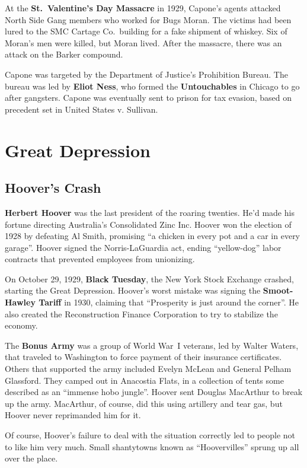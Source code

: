 At the \textbf{St.\ Valentine's Day Massacre} in 1929,
Capone's agents attacked North Side Gang members who worked for Bugs Moran.
The victims had been lured to the SMC Cartage Co.\ building for a fake shipment of whiskey.
Six of Moran's men were killed, but Moran lived.
After the massacre, there was an attack on the Barker compound.

Capone was targeted by the Department of Justice's Prohibition Bureau.
The bureau was led by \textbf{Eliot Ness}, who formed the \textbf{Untouchables} in Chicago to go after gangsters.
Capone was eventually sent to prison for tax evasion,
based on precedent set in United States v. Sullivan.

\section{Great Depression}

\subsection*{Hoover's Crash}

\textbf{Herbert Hoover} was the last president of the roaring twenties.
He'd made his fortune directing Australia's Consolidated Zinc Inc.
Hoover won the election of 1928 by defeating Al Smith,
promising ``a chicken in every pot and a car in every garage''.
Hoover signed the Norris-LaGuardia act,
ending ``yellow-dog'' labor contracts that prevented employees from unionizing.

On October 29, 1929, \textbf{Black Tuesday}, the New York Stock Exchange crashed, starting the Great Depression.
Hoover's worst mistake was signing the \textbf{Smoot-Hawley Tariff} in 1930,
claiming that ``Prosperity is just around the corner''.
He also created the Reconstruction Finance Corporation to try to stabilize the economy.

The \textbf{Bonus Army} was a group of World War~I veterans, led by Walter Waters,
that traveled to Washington to force payment of their insurance certificates.
Others that supported the army included Evelyn McLean and General Pelham Glassford.
They camped out in Anacostia Flats, in a collection of tents some described as an ``immense hobo jungle''.
Hoover sent Douglas MacArthur to break up the army.
MacArthur, of course, did this using artillery and tear gas, but Hoover never reprimanded him for it.

Of course, Hoover's failure to deal with the situation correctly led to people not to like him very much.
Small shantytowns known as ``Hoovervilles'' sprung up all over the place.


